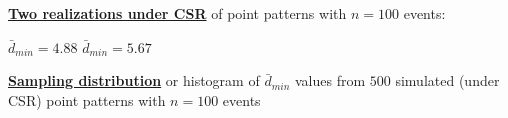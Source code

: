 \documentclass[portrait]{seminar}
\begin{document}
%
%
\begin{slide*}
\begin{center}
 \vspace*{-0.5cm} 
\end{center}
 \vspace{0.3cm}

\underline{\textbf{Two realizations under CSR}} of point patterns
with $n=100$ events:

\vspace{0.1cm}
\begin{center}
\begin{figure}
 \hspace{0.5cm}
\end{figure}
\end{center}
\vspace{-0.4cm} {\small \hspace{1.6cm} $\bar{d}_{min} = 4.88$
\hspace{2.2cm} $\bar{d}_{min} = 5.67$}

\vspace{0.3cm}\underline{\textbf{Sampling distribution}} or
histogram of $\bar{d}_{min}$ values from $500$ simulated (under CSR)
point patterns with $n=100$ events

\vspace{0.0cm}
\begin{center}
\begin{figure}
\end{figure}
\end{center}

\end{slide*}
\end{document}
